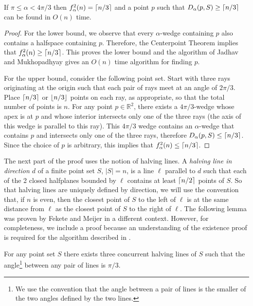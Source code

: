 \documentclass[lotsofwhite]{patmorin}
\begin{document}
\begin{lem}
If $\pi\le \alpha < 4\pi/3$ then $f^2_\alpha(n) = \left\lceil n/3 \right\rceil$ and a
point $p$ such that $D_\alpha(p,S)\ge \left\lceil n/3 \right\rceil$ can be found in $O(n)$ time.
\end{lem}

\begin{proof} 
For the lower bound, we observe that every $\alpha$-wedge containing
$p$ also contains a halfspace containing $p$.  Therefore, the
Centerpoint Theorem implies that $f^2_\alpha(n) \ge \left\lceil n/3 \right\rceil$.  This
proves the lower bound and the algorithm of Jadhav and Mukhopadhyay
\cite{jm94} gives an $O(n)$ time algorithm for finding $p$.

For the upper bound, consider the following point set.  Start with
three rays originating at the origin such that each pair of rays meet at an
angle of $2\pi/3$.  Place $\left\lceil n/3 \right\rceil$ or $\left\lfloor n/3 \right\rfloor$ points on each
ray, as appropriate, so that the total number of points is $n$.  For
any point $p\in\mathbb{R}^2$, there exists a $4\pi/3$-wedge whose apex
is at $p$ and whose interior intersects only one of the three rays
(the axis of this wedge is parallel to this ray). This $4\pi/3$ wedge
contains an $\alpha$-wedge that contains $p$ and intersects only one
of the three rays, therefore $D_\alpha(p,S)\le \left\lceil n/3 \right\rceil$.  Since the
choice of $p$ is arbitrary, this implies that $f^2_\alpha(n) \le
\left\lceil n/3 \right\rceil$.  
\end{proof}

The next part of the proof uses the notion of halving lines.  A
\emph{halving line in direction $d$} of a finite point set $S$,
$|S|=n$, is a line $\ell$ parallel to $d$ such that each of the 2
closed halfplanes bounded by $\ell$ contains at least
$\left\lceil n/2 \right\rceil$ points of $S$.  So that halving lines are uniquely
defined by direction, we will use the convention that, if $n$ is even,
then the closest point of $S$ to the left of $\ell$ is at the same
distance from $\ell$ as the closest point of $S$ to the right of
$\ell$.  The following lemma was proven by Fekete and Meijer
\cite[Lemma~2]{fm00} in a different context.  However, for
completeness, we include a proof because an understanding of the
existence proof is required for the algorithm described in
.

\begin{lem}
For any point set $S$ there exists three concurrent halving lines 
of $S$ such that the angle\footnote{We use the convention that
the angle between a pair of lines is the smaller of the two angles
defined by the two lines.} between any pair of lines is $\pi/3$.
\end{lem}
\end{document}
